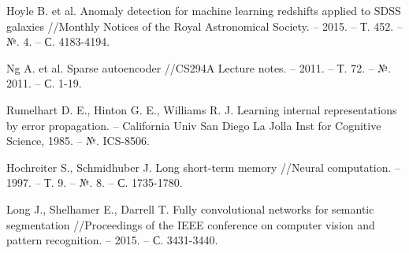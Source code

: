 \documentclass[12pt]{article}
\begin{document}
\begin{thebibliography}{20}

        Hoyle B. et al. Anomaly detection for machine learning redshifts applied to SDSS galaxies //Monthly Notices of the Royal Astronomical Society. – 2015. – Т. 452. – №. 4. – С. 4183-4194.

        Ng A. et al. Sparse autoencoder //CS294A Lecture notes. – 2011. – Т. 72. – №. 2011. – С. 1-19.

        Rumelhart D. E., Hinton G. E., Williams R. J. Learning internal representations by error propagation. – California Univ San Diego La Jolla Inst for Cognitive Science, 1985. – №. ICS-8506.

        Hochreiter S., Schmidhuber J. Long short-term memory //Neural computation. – 1997. – Т. 9. – №. 8. – С. 1735-1780.


        Long J., Shelhamer E., Darrell T. Fully convolutional networks for semantic segmentation //Proceedings of the IEEE conference on computer vision and pattern recognition. – 2015. – С. 3431-3440.

    \end{thebibliography}
\end{document}
